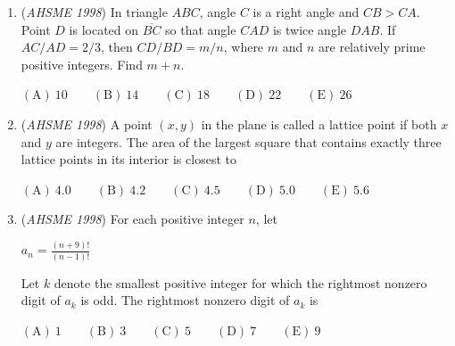 \begin{enumerate}
	\item (\textit{AHSME 1998}) In triangle $ABC$, angle $C$ is a right angle and $CB > CA$. Point $D$ is located on $\overline{BC}$ so that angle $CAD$ is twice angle $DAB$. If $AC/AD = 2/3$, then $CD/BD = m/n$, where $m$ and $n$ are relatively prime positive integers. Find $m+n$.


 $\mathrm{(A) \ }10 \qquad \mathrm{(B) \ }14 \qquad \mathrm{(C) \ }18 \qquad \mathrm{(D) \ }22 \qquad \mathrm{(E) \ } 26$


	\item (\textit{AHSME 1998}) A point $(x,y)$ in the plane is called a lattice point if both $x$ and $y$ are integers. The area of the largest square that contains exactly three lattice points in its interior is closest to


 $\mathrm{(A) \ } 4.0 \qquad \mathrm{(B) \ } 4.2 \qquad \mathrm{(C) \ } 4.5 \qquad \mathrm{(D) \ } 5.0 \qquad \mathrm{(E) \ }  5.6$


	\item (\textit{AHSME 1998}) For each positive integer $n$, let 


 $a_n = \frac{(n+9)!}{(n-1)!}$

 Let $k$ denote the smallest positive integer for which the rightmost nonzero digit of $a_k$ is odd. The rightmost nonzero digit of $a_k$ is


 $\mathrm{(A) \ }1 \qquad \mathrm{(B) \ }3 \qquad \mathrm{(C) \ }5 \qquad \mathrm{(D) \ } 7 \qquad \mathrm{(E) \ } 9$


\end{enumerate}